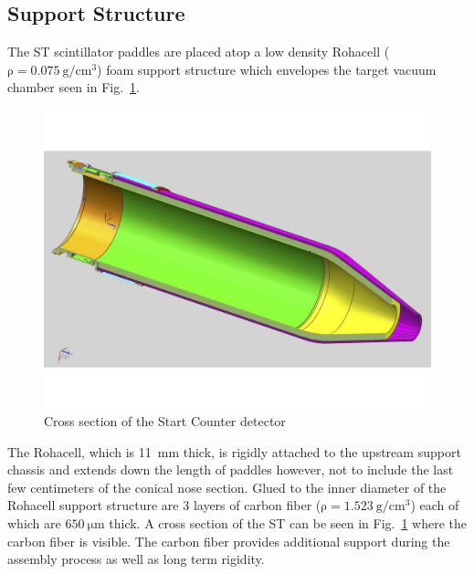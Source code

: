 \subsection{Support Structure} \label{sec:design_support}

The ST scintillator paddles are placed atop a low density Rohacell ($\mathrm{\rho = 0.075\ g/cm^{3}}$) foam support structure which envelopes the target vacuum chamber seen in Fig.~\ref{fig:stiso}.  
	\begin{figure}[!htb]
		\centering
		\includegraphics[width=1.0\columnwidth]{design/figs/st_iso}
		\caption{Cross section of the Start Counter detector}
		\label{fig:stiso}
	\end{figure}
The Rohacell, which is 11~mm thick, is rigidly attached to the upstream support chassis and extends down the length of paddles however, not to include the last few centimeters of the conical nose section.  Glued to the inner diameter of the Rohacell support structure are 3 layers of carbon fiber ($\mathrm{\rho = 1.523\ g/cm^{3}}$) each of which are $\mathrm{650\ \mu m}$ thick.  A cross section of the ST can be seen in Fig.~\ref{fig:stiso} where the carbon fiber is visible.  The carbon fiber provides additional support during the assembly process as well as long term rigidity.  

